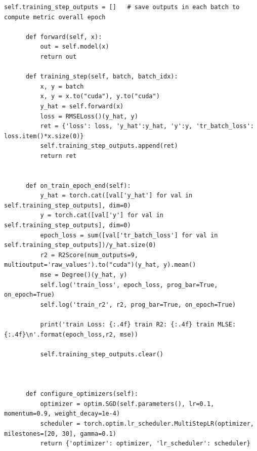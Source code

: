 \documentclass[a4paper,11pt,dvipdfmx]{jreport}
\begin{document}
\begin{lstlisting}[caption=印象判定用NN{,} DenseNetに関するソースコード, label=source]
          self.training_step_outputs = []   # save outputs in each batch to compute metric overall epoch
  
      def forward(self, x):
          out = self.model(x)
          return out
  
      def training_step(self, batch, batch_idx):
          x, y = batch
          x, y = x.to("cuda"), y.to("cuda")
          y_hat = self.forward(x)
          loss = RMSELoss()(y_hat, y)
          ret = {'loss': loss, 'y_hat':y_hat, 'y':y, 'tr_batch_loss': loss.item()*x.size(0)}
          self.training_step_outputs.append(ret)
          return ret
  
  
      def on_train_epoch_end(self):
          y_hat = torch.cat([val['y_hat'] for val in self.training_step_outputs], dim=0)
          y = torch.cat([val['y'] for val in self.training_step_outputs], dim=0)
          epoch_loss = sum([val['tr_batch_loss'] for val in self.training_step_outputs])/y_hat.size(0)
          r2 = R2Score(num_outputs=9, multioutput='raw_values').to("cuda")(y_hat, y).mean()
          mse = Degree()(y_hat, y)
          self.log('train_loss', epoch_loss, prog_bar=True, on_epoch=True)
          self.log('train_r2', r2, prog_bar=True, on_epoch=True)
  
          print('train Loss: {:.4f} train R2: {:.4f} train MLSE: {:.4f}\n'.format(epoch_loss,r2, mse))
  
          self.training_step_outputs.clear()
  
  
  
      def configure_optimizers(self):
          optimizer = optim.SGD(self.parameters(), lr=0.1, momentum=0.9, weight_decay=1e-4)
          scheduler = torch.optim.lr_scheduler.MultiStepLR(optimizer, milestones=[20, 30], gamma=0.1)
          return {'optimizer': optimizer, 'lr_scheduler': scheduler}
\end{lstlisting}
\newpage
{}
\renewcommand{\bibname}{参考文献}

%
%
\end{document}
